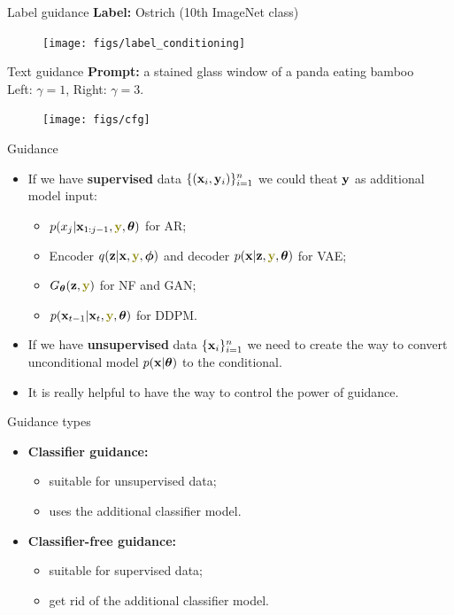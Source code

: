 \begin{frame}{Label guidance}
	\textbf{Label:} Ostrich (10th ImageNet class) 
	\begin{figure}
		\texttt{[image: figs/label\_conditioning]}
	\end{figure}
	\end{frame}
\begin{frame}{Text guidance}
	\textbf{Prompt:} a stained glass window of a panda eating bamboo \\
	Left: $\gamma = 1$, Right: $\gamma = 3$.
	\begin{figure}
		\texttt{[image: figs/cfg]}
	\end{figure}
\end{frame}
\begin{frame}{Guidance}
	\begin{itemize}
	\item If we have \textbf{supervised} data $\{(\mathbf{x}_i, \mathbf{y}_i)\}_{i=1}^n$ we could theat $\mathbf{y}$ as additional model input:
	\begin{itemize}
		\item $p(x_j | \bx_{1:j-1}, {\color{olive}\by}, \btheta)$ for AR;
		\item Encoder $q(\bz | \bx, {\color{olive}\by}, \bphi)$ and decoder $p(\bx | \bz, {\color{olive}\by}, \btheta)$ for VAE;
		\item $G_{\btheta}(\bz, {\color{olive}\by})$ for NF and GAN;
		\item $p(\bx_{t-1} | \bx_t, {\color{olive}\by}, \btheta)$ for DDPM.
	\end{itemize}
	\item If we have \textbf{unsupervised} data $\{\mathbf{x}_i\}_{i=1}^n$ we need to create the way to convert unconditional model $p(\mathbf{x} | \boldsymbol{\theta})$ to the conditional.
	\item It is really helpful to have the way to control the power of guidance.
	\end{itemize}
	\begin{block}{Guidance types}
		\begin{itemize}
			\item \textbf{Classifier guidance:} 
				\begin{itemize}
					\item suitable for unsupervised data;
					\item uses the additional classifier model.
				\end{itemize}
			\item \textbf{Classifier-free guidance:} 
				\begin{itemize}
					\item suitable for supervised data;
					\item get rid of the additional classifier model.
				\end{itemize}
		\end{itemize}
	\end{block}
\end{frame}
